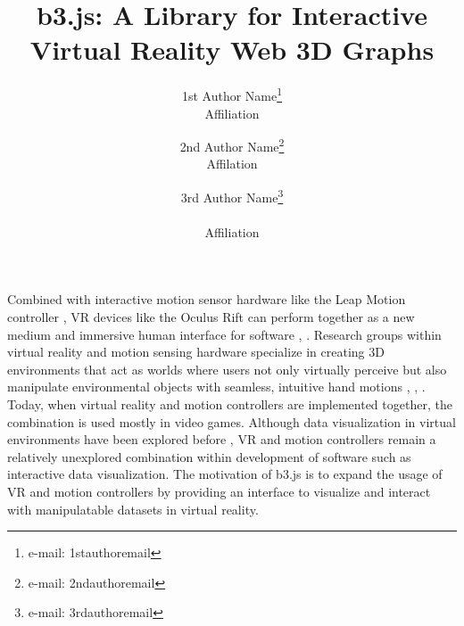 \documentclass{vgtc}                          %
\title{b3.js: A Library for Interactive Virtual Reality Web 3D Graphs}
\author{1st Author Name\thanks{e-mail: 1stauthoremail}\\ %
        \scriptsize Affiliation %
\and 2nd Author Name\thanks{e-mail: 2ndauthoremail}\\ %
     \scriptsize Affilation %
\and 3rd Author Name\thanks{e-mail: 3rdauthoremail}\\ %
     \parbox{1.4in}{\scriptsize \centering Affiliation}}
\begin{document}


\maketitle


Combined with interactive motion sensor hardware like the Leap Motion controller \cite{motion2014leap}, VR devices like the Oculus Rift \cite{oculus2015oculus} can perform together as a new medium and immersive human interface for software \cite{coelho2014pointing}, \cite{khattak2014real}. Research groups within virtual reality and motion sensing hardware specialize in creating 3D environments that act as worlds where users not only virtually perceive but also manipulate environmental objects with seamless, intuitive hand motions \cite{febretti2014omegalib}, \cite{espitia2014development}, \cite{vinkler2014integrating}. Today, when virtual reality and motion controllers are implemented together, the combination is used mostly in video games. Although data visualization in virtual environments have been explored before \cite{helbig2014concept}, VR and motion controllers remain a relatively unexplored combination within development of software such as interactive data visualization. The motivation of b3.js is to expand the usage of VR and motion controllers by providing an interface to visualize and interact with manipulatable datasets in virtual reality.
\end{document}
